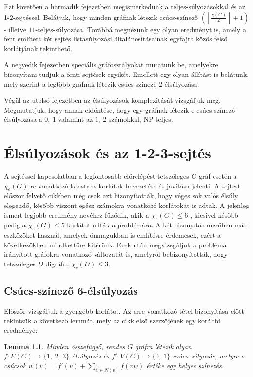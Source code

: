 \documentclass[12pt, a4paper]{report}
\newtheorem{lem}[tét]{Lemma}
\theoremstyle{remark}
\theoremstyle{definition}
\begin{document}
Ezt követően a harmadik fejezetben megismerkedünk a teljes-súlyozásokkal és az 1-2-sejtéssel. Belátjuk, hogy minden gráfnak létezik csúcs-színező $\left( \left\lfloor \frac{χ(G)}{2} \right\rfloor + 1 \right)$- illetve $11$-teljes-súlyozása. Továbbá megnézünk egy olyan eredményt is, amely a fent említett két sejtés listasúlyozási általánosításainak egyfajta közös felső korlátjának tekinthető.

A negyedik fejezetben speciális gráfosztályokat mutatunk be, amelyekre bizonyítani tudjuk a fenti sejtések egyikét. Emellett egy olyan állítást is belátunk, mely szerint a legtöbb gráfnak létezik csúcs-színező $2$-élsúlyozása.

Végül az utolsó fejezetben az élsúlyozások komplexitását vizsgáljuk meg. Megmutatjuk, hogy annak eldöntése, hogy egy gráfnak létezik-e csúcs-színező élsúlyozása a $0,\ 1$ valamint az $1,\ 2$ számokkal, NP-teljes.

\chapter{Élsúlyozások és az 1-2-3-sejtés}
A sejtéssel kapcsolatban a legfontosabb előrelépést tetszőleges $G$ gráf esetén a $\chi_e(G)$-re vonatkozó konstans korlátok bevezetése és javítása jelenti. A sejtést először felvető cikkben még csak azt bizonyították, hogy véges sok valós élsúly elegendő, később viszont egész számokra vonatkozó korlátokat is adtak. A jelenleg ismert legjobb eredmény \citeauthor{Kalkowski2010} nevéhez fűződik, akik a $\chi_e(G) \leq 6$ \cite{Kalkowski2009}, kicsivel később pedig a $\chi_e(G) \leq 5$ \cite{Kalkowski2010} korlátot adták a problémára. A két bizonyítás merőben más eszközöket használ, amelyek önmagukban is említésre érdemesek, ezért a következőkben mindkettőre kitérünk. Ezek után megvizsgáljuk a probléma irányított gráfokra vonatkozó változatát is, amelyről \citeauthor{Baudon2014} \cite{Baudon2014} bebizonyították, hogy tetszőleges $D$ digráfra $\chi_e(D) \leq 3$.

\section{Csúcs-színező 6-élsúlyozás}
Először vizsgáljuk a gyengébb korlátot. Az erre vonatkozó tétel bizonyítása előtt tekintsük a következő lemmát, mely az \cite{Kalkowski2009} cikk első szerzőjének egy korábbi eredménye:

\begin{lem}
Minden összefüggő, rendes $G$ gráfra létezik olyan $f:E(G) \rightarrow \lbrace 1,\ 2,\ 3 \rbrace$ élsúlyozás és $f':V(G) \rightarrow \lbrace 0,\ 1 \rbrace$ csúcs-súlyozás, melyre a csúcsok $w(v) = f'(v) + \sum\limits_{w \in N(v)} f(vw)$ értéke egy helyes színezés.
\end{lem}
\end{document}

